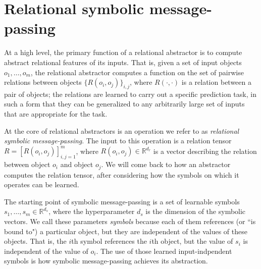 
\def\m{m}


\section{Relational symbolic message-passing}
\label{sec:message_passing}

At a high level, the primary function of a relational abstractor is to compute abstract relational features of its
inputs. That is, given a set of input objects $o_1, \ldots, o_\m$, the relational abstractor computes a function on
the set of pairwise relations between objects $\{ R(o_i, o_j) \}_{i,j}$, where $R(\cdot, \cdot)$ is a relation between a pair of objects; the relations are learned to carry out a specific prediction task,
in such a form that they can be generalized to any arbitrarily large set of inputs that are appropriate for the task.

At the core of relational abstractors is an operation we refer to as \textit{relational symbolic message-passing}.
The input to this operation is a relation tensor $R = \left[R(o_i, o_j)\right]_{i,j=1}^\m$, where $R(o_i, o_j) \in \mathbb{R}^{d_r}$ is a vector describing the relation between object $o_i$ and object $o_j$. We will come back to how an abstractor computes the relation tensor,
after considering how the symbols on which it operates can be learned.

The starting point of symbolic message-passing is a set of learnable symbols $s_1, \ldots, s_\m \in \mathbb{R}^{d_s}$, where the hyperparameter $d_s$ is the dimension of the symbolic vectors. We call these parameters \textit{symbols} because each of them references (or ``is bound to") a particular object, but they are independent of the values of these objects. That is, the $i$th symbol references the $i$th object, but the value of $s_i$ is independent of the value of $o_i$. The use of those learned input-indpendent symbols is how symbolic message-passing achieves its abstraction.

